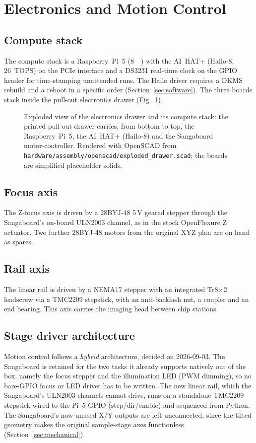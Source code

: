 \section{Electronics and Motion Control}
\label{sec:electronics}

\subsection{Compute stack}
The compute stack is a Raspberry~Pi~5 (\SI{8}{\giga\byte}) with the AI~HAT+
(Hailo-8, \SI{26}{TOPS}) on the PCIe interface and a DS3231 real-time clock on
the GPIO header for time-stamping unattended runs. The Hailo driver requires a
DKMS rebuild and a reboot in a specific order (Section~\ref{sec:software}).
The three boards stack inside the pull-out electronics drawer
(Fig.~\ref{fig:drawer}).

\begin{figure}[!t]
  \centering
  \caption{Exploded view of the electronics drawer and its compute stack: the
  printed pull-out drawer carries, from bottom to top, the Raspberry~Pi~5, the
  AI~HAT+ (Hailo-8) and the Sangaboard motor-controller. Rendered with OpenSCAD
  from \texttt{hardware/assembly/openscad/exploded\_drawer.scad}; the boards are
  simplified placeholder solids.}
  \label{fig:drawer}
\end{figure}

\subsection{Focus axis}
The Z-focus axis is driven by a 28BYJ-48 5\,V geared stepper through the
Sangaboard's on-board ULN2003 channel, as in the stock OpenFlexure Z actuator.
Two further 28BYJ-48 motors from the original XYZ plan are on hand as spares.

\subsection{Rail axis}
The linear rail is driven by a NEMA17 stepper with an integrated Tr8$\times$2
leadscrew via a TMC2209 stepstick, with an anti-backlash nut, a coupler and an
end bearing. This axis carries the imaging head between chip stations.

\subsection{Stage driver architecture}
Motion control follows a \emph{hybrid} architecture, decided on
2026-09-03. The Sangaboard is retained for the two tasks it already supports
natively out of the box, namely the focus stepper and the illumination LED (PWM
dimming), so no bare-GPIO focus or LED driver has to be written. The new linear
rail, which the Sangaboard's ULN2003 channels cannot drive, runs on a
standalone TMC2209 stepstick wired to the Pi~5 GPIO (step/dir/enable) and
sequenced from Python. The Sangaboard's now-unused X/Y outputs are left
unconnected, since the tilted geometry makes the original sample-stage axes
functionless (Section~\ref{sec:mechanical}).

